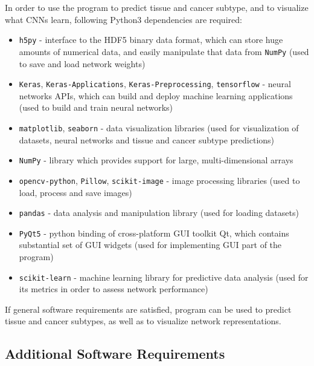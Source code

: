 In order to use the program to predict tissue and cancer subtype, and to visualize what CNNs learn, following Python3 dependencies are required: 
\begin{itemize}
	\itemsep 0em
	\item \texttt{h5py} - interface to the HDF5 binary data format, which can store huge amounts of numerical data, and easily manipulate that data from \texttt{NumPy} (used to save and load network weights)
	\item \texttt{Keras}, \texttt{Keras-Applications}, \texttt{Keras-Preprocessing}, \texttt{tensorflow} - neural networks APIs, which can build and deploy machine learning applications (used to build and train neural networks)
	\item \texttt{matplotlib}, \texttt{seaborn} - data visualization libraries (used for visualization of datasets, neural networks and tissue and cancer subtype predictions)
	\item \texttt{NumPy} - library which provides support for large, multi-dimensional arrays
	\item \texttt{opencv-python}, \texttt{Pillow}, \texttt{scikit-image} - image processing libraries (used to load, process and save images)
	\item \texttt{pandas} - data analysis and manipulation library (used for loading datasets)
	\item \texttt{PyQt5} - python binding of cross-platform GUI toolkit Qt, which contains substantial set of GUI widgets (used for implementing GUI part of the program)
	\item \texttt{scikit-learn} - machine learning library for predictive data analysis (used for its metrics in order to assess network performance)
\end{itemize}
If general software requirements are satisfied, program can be used to predict tissue and cancer subtypes, as well as to visualize network representations.

\subsection{Additional Software Requirements}

